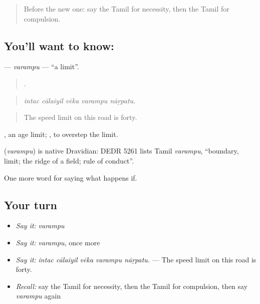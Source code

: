 \label{lesson:TA-C384-varampu}



\begin{quote}
Before the new one: say the Tamil for necessity, then the Tamil for compulsion.
\end{quote}

\subsection*{You'll want to know: }
\textbf{} — \emph{varampu} — \textquotedblleft{}a limit\textquotedblright{}.

\begin{quote}
    .
\end{quote}

\begin{quote}
\emph{intac cālaiyil vēka varampu nāṟpatu.}
\end{quote}

\begin{quote}
The speed limit on this road is forty.
\end{quote}

 , an age limit;  , to overstep the limit.

\begin{cousinweb}
\textbf{} (\emph{varampu}) is native Dravidian: DEDR 5261 lists Tamil \emph{varampu}, \textquotedblleft{}boundary, limit; the ridge of a field; rule of conduct\textquotedblright{}.
\end{cousinweb}

\begin{grammarlens}[title={What you've built}]
One more word for saying what happens if.
\end{grammarlens}

\subsection*{Your turn}
\begin{itemize}
\raggedright
  \item \emph{Say it:} \emph{varampu}
  \item \emph{Say it:} \emph{varampu}, once more
  \item \emph{Say it:} \emph{intac cālaiyil vēka varampu nāṟpatu.} — The speed limit on this road is forty.
  \item \emph{Recall:} say the Tamil for necessity, then the Tamil for compulsion, then say \emph{varampu} again
\end{itemize}


